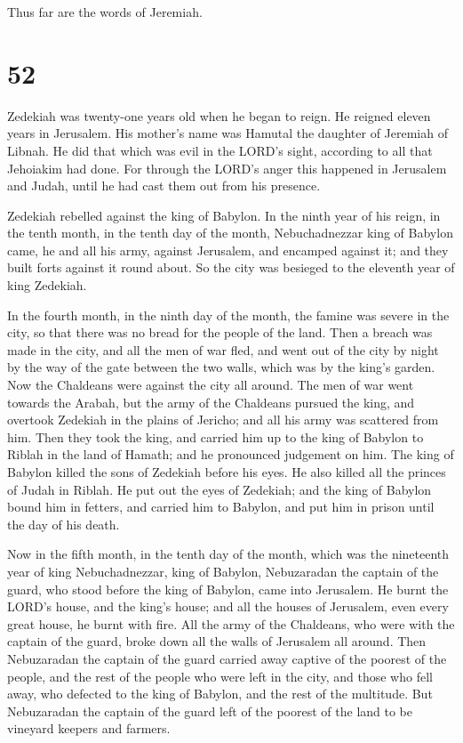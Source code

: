 Thus far are the words of Jeremiah.

\hypertarget{section-51}{%
\section{52}\label{section-51}}

 Zedekiah was twenty-one years old when he began to reign.
He reigned eleven years in Jerusalem. His mother's name was Hamutal the
daughter of Jeremiah of Libnah.  He did that which was
evil in the LORD's sight, according to all that Jehoiakim had done.
 For through the LORD's anger this happened in Jerusalem
and Judah, until he had cast them out from his presence.

Zedekiah rebelled against the king of Babylon.  In the
ninth year of his reign, in the tenth month, in the tenth day of the
month, Nebuchadnezzar king of Babylon came, he and all his army, against
Jerusalem, and encamped against it; and they built forts against it
round about.  So the city was besieged to the eleventh
year of king Zedekiah.

 In the fourth month, in the ninth day of the month, the
famine was severe in the city, so that there was no bread for the people
of the land.  Then a breach was made in the city, and all
the men of war fled, and went out of the city by night by the way of the
gate between the two walls, which was by the king's garden. Now the
Chaldeans were against the city all around. The men of war went towards
the Arabah,  but the army of the Chaldeans pursued the
king, and overtook Zedekiah in the plains of Jericho; and all his army
was scattered from him.  Then they took the king, and
carried him up to the king of Babylon to Riblah in the land of Hamath;
and he pronounced judgement on him.  The king of Babylon
killed the sons of Zedekiah before his eyes. He also killed all the
princes of Judah in Riblah.  He put out the eyes of
Zedekiah; and the king of Babylon bound him in fetters, and carried him
to Babylon, and put him in prison until the day of his death.

 Now in the fifth month, in the tenth day of the month,
which was the nineteenth year of king Nebuchadnezzar, king of Babylon,
Nebuzaradan the captain of the guard, who stood before the king of
Babylon, came into Jerusalem.  He burnt the LORD's house,
and the king's house; and all the houses of Jerusalem, even every great
house, he burnt with fire.  All the army of the
Chaldeans, who were with the captain of the guard, broke down all the
walls of Jerusalem all around.  Then Nebuzaradan the
captain of the guard carried away captive of the poorest of the people,
and the rest of the people who were left in the city, and those who fell
away, who defected to the king of Babylon, and the rest of the
multitude.  But Nebuzaradan the captain of the guard left
of the poorest of the land to be vineyard keepers and farmers.

